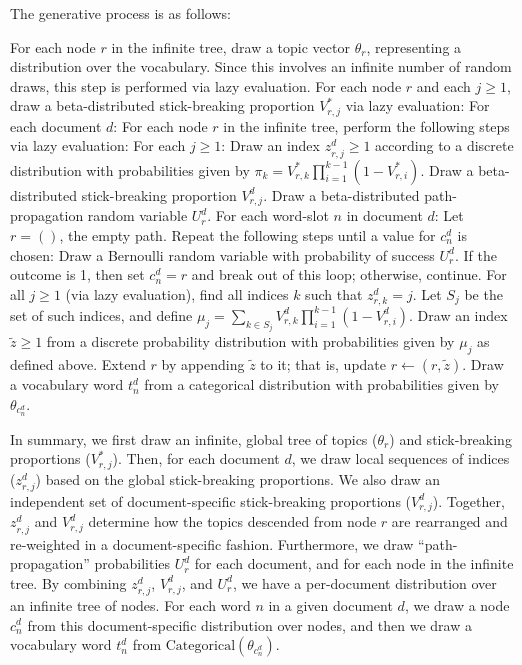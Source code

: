 \documentclass{article}
\begin{document}
The generative process is as follows:
\begin{outline}[enumerate]
\1 For each node $r$ in the infinite tree, draw a topic vector $\theta_r$, representing a distribution over the vocabulary.
Since this involves an infinite number of random draws, this step is performed via lazy evaluation.
\1 For each node $r$ and each $j \geq 1$, draw a beta-distributed stick-breaking proportion $V^*_{r,j}$ via lazy evaluation:
\1 For each document $d$:
  \2 For each node $r$ in the infinite tree, perform the following steps via lazy evaluation:
    \3 For each $j \geq 1$:
      \4 Draw an index $z^d_{r,j} \geq 1$ according to a discrete distribution with probabilities given by $\pi_k = V^*_{r,k} \prod_{i=1}^{k-1} (1-V^*_{r,i})$.
      \4 Draw a beta-distributed stick-breaking proportion $V^d_{r,j}$.
  \2 Draw a beta-distributed path-propagation random variable $U^d_r$.
  \2 For each word-slot $n$ in document $d$:
    \3 Let $r = ()$, the empty path.
    \3 Repeat the following steps until a value for $c^d_n$ is chosen:
      \4 Draw a Bernoulli random variable with probability of success $U^d_r$.
      \4 If the outcome is 1, then set $c^d_n = r$ and break out of this loop; otherwise, continue.
      \4 For all $j \geq 1$ (via lazy evaluation), find all indices $k$ such that $z^d_{r,k} = j$.  Let $S_j$ be the set of such indices, and define $\mu_j = \sum_{k \in S_j} V^d_{r,k} \prod_{i=1}^{k-1} (1-V^d_{r,i})$.
      \4 Draw an index $\tilde z \geq 1$ from a discrete probability distribution with probabilities given by $\mu_j$ as defined above.
      \4 Extend $r$ by appending $\tilde z$ to it; that is, update $r \gets (r, \tilde z)$.
    \3 Draw a vocabulary word $t^d_n$ from a categorical distribution with probabilities given by $\theta_{c^d_n}$.
\end{outline}

In summary, we first draw an infinite, global tree of topics ($\theta_r$) and stick-breaking proportions ($V^*_{r,j}$).
Then, for each document $d$, we draw local sequences of indices ($z^d_{r,j}$) based on the global stick-breaking proportions.
We also draw an independent set of document-specific stick-breaking proportions ($V^d_{r,j}$).
Together, $z^d_{r,j}$ and $V^d_{r,j}$ determine how the topics descended from node $r$ are rearranged and re-weighted in a document-specific fashion.
Furthermore, we draw ``path-propagation'' probabilities $U^d_r$ for each document, and for each node in the infinite tree.
By combining $z^d_{r,j}$, $V^d_{r,j}$, and $U^d_r$, we have a per-document distribution over an infinite tree of nodes.
For each word $n$ in a given document $d$, we draw a node $c^d_n$ from this document-specific distribution over nodes, and then we draw a vocabulary word $t^d_n$ from ${\text{Categorical}(\theta_{c^d_n})}$.
\end{document}
